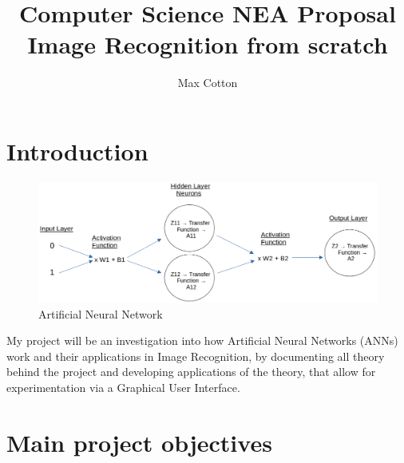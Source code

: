 \documentclass[10pt,a4paper]{article}
\title{Computer Science NEA Proposal
       \bigbreak
       \large Image Recognition from scratch}
\author{Max Cotton}
\date{}
\begin{document}
\maketitle

\section{Introduction}
\begin{figure}[h!]
\centering
\includegraphics[width=1\textwidth]{./project-report/src/images/shallow-ann-diagram.png}
\caption{Artificial Neural Network}
\end{figure}

My project will be an investigation into how Artificial Neural Networks (ANNs) work and their applications in Image Recognition, by documenting all theory behind the 
project and developing applications of the theory, that allow for experimentation via a Graphical User Interface. 

\section{Main project objectives}
\end{document}
